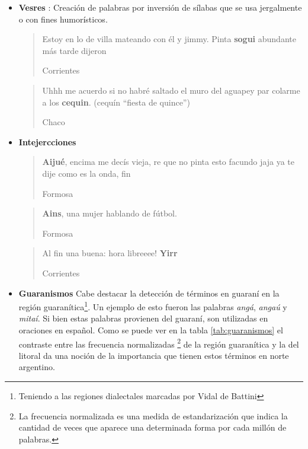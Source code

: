 \begin{itemize}
  \blockquote[Chaco]{Es lo mas lindo no ir al colegio y quedarme a tomar \textbf{teresss}}


\item \textbf{Vesres} : Creación de palabras por inversión de sílabas que se usa jergalmente o con fines humorísticos.

  \blockquote[Corrientes]{Estoy en lo de villa mateando con él y jimmy. Pinta \textbf{sogui} abundante más tarde dijeron }

  \blockquote[Chaco]{Uhhh me acuerdo si no habré saltado el muro del aguapey par colarme a los \textbf{cequin}. (cequín “fiesta de quince”)}

\item \textbf{Intejercciones}

  \blockquote[Formosa]{\textbf{Aijué}, encima me decís vieja, re que no pinta esto facundo jaja ya te dije como es la onda, fin }

  \blockquote[Formosa]{\textbf{Ains}, una mujer hablando de fútbol.}

  \blockquote[Corrientes]{Al fin una buena: hora libreeee! \textbf{Yirr} }

\item \textbf{Guaranismos}
\label{sub:guaranismos}
Cabe destacar la detección de términos en guaraní en la región  guaranítica\footnote{Teniendo a las regiones dialectales marcadas por Vidal de Battini}.
Un ejemplo de esto fueron las palabras \textit{angá}, \textit{angaú} y \textit{mitaí}.  Si bien estas palabras provienen del guaraní, son utilizadas en oraciones en español.
Como se puede ver en la tabla \ref{tab:guaranismos} el contraste entre las frecuencia normalizadas \footnote{La frecuencia normalizada es una medida de estandarización que indica la cantidad de veces que aparece una determinada forma por cada millón de palabras.} de la región guaranítica y la del litoral da una noción de la importancia que tienen estos términos en norte argentino. 


\end{itemize}






